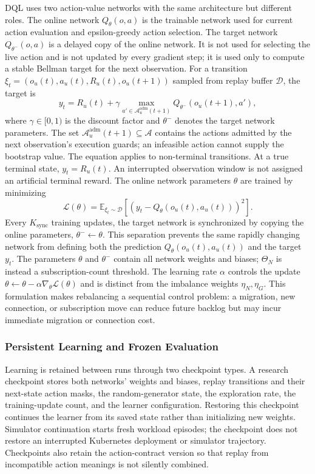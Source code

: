 \documentclass[manuscript]{acmart}
\begin{document}
DQL uses two action-value networks with the same architecture but different
roles. The online network $Q_\theta(o,a)$ is the trainable network used for
current action evaluation and epsilon-greedy action selection. The target
network $Q_{\theta^-}(o,a)$ is a delayed copy of the online network. It is not
used for selecting the live action and is not updated by every gradient step;
it is used only to compute a stable Bellman target for the next observation.
For a transition
$\xi_t=(o_u(t),a_u(t),R_u(t),o_u(t+1))$ sampled from replay buffer
$\mathcal{D}$, the target is
\begin{equation}
	y_t =
	R_u(t) + \gamma
	\max_{a'\in\mathcal{A}^{\mathrm{adm}}_u(t+1)}Q_{\theta^-}(o_u(t+1),a'),
	\label{eq:dql_target}
\end{equation}
where $\gamma\in[0,1)$ is the discount factor and $\theta^-$ denotes the target
network parameters. The set $\mathcal{A}^{\mathrm{adm}}_u(t+1)\subseteq\mathcal{A}$
contains the actions admitted by the next observation's execution guards;
an infeasible action cannot supply the bootstrap value. The equation applies
to non-terminal transitions. At a true terminal state, $y_t=R_u(t)$.
An interrupted observation window is not assigned an artificial terminal
reward. The online network parameters $\theta$ are trained by
minimizing
\begin{equation}
	\mathcal{L}(\theta)=
	\mathbb{E}_{\xi_t\sim\mathcal{D}}
	\left[
	\left(y_t-Q_\theta(o_u(t),a_u(t))\right)^2
	\right].
	\label{eq:dql_loss}
\end{equation}
Every $K_{\mathrm{sync}}$ training updates, the target network is synchronized by copying the
online parameters, $\theta^- \leftarrow \theta$. This separation prevents the
same rapidly changing network from defining both the prediction
$Q_\theta(o_u(t),a_u(t))$ and the target $y_t$. The parameters $\theta$ and
$\theta^-$ contain all network weights and biases; $\Theta_N$ is instead a
subscription-count threshold. The learning rate $\alpha$ controls the update
$\theta\leftarrow\theta-\alpha\nabla_\theta\mathcal{L}(\theta)$ and is
distinct from the imbalance weights $\eta_N,\eta_G$.
This formulation makes rebalancing a sequential control problem: a migration,
new connection, or subscription move can reduce future backlog but may incur
immediate migration or connection cost.

\subsubsection{Persistent Learning and Frozen Evaluation}
Learning is retained between runs through two checkpoint types. A research
checkpoint stores both networks' weights and biases, replay transitions and
their next-state action masks, the random-generator state, the exploration
rate, the training-update count, and the learner configuration. Restoring this
checkpoint continues the learner from its saved state rather than initializing
new weights. Simulator continuation starts fresh workload episodes; the
checkpoint does not restore an interrupted Kubernetes deployment or simulator
trajectory. Checkpoints also retain the action-contract version so that replay
from incompatible action meanings is not silently combined.
\end{document}
